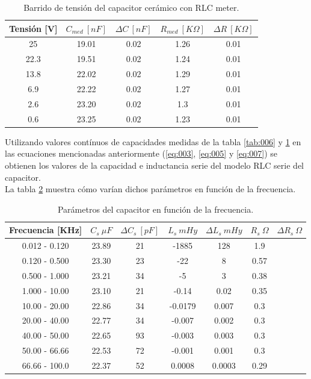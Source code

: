 \documentclass[a4paper,10pt]{article}
\begin{document}
		\begin{table}[!htp]
			\centering
			\begin{tabular}{|c|c|c|c|c|}
				\hline
				Tensión [V] & $C_{med}~[nF]$ & $\Delta C~[nF]$ & 
				$R_{med}~[K\Omega]$ & $\Delta R~[K\Omega]$\\
				\hline
				25 &	19.01 & 0.02 & 1.26 & 0.01 \\
				\hline
				22.3 &	19.51 & 0.02 & 1.24 & 0.01 \\
				\hline
				13.8 &	22.02 & 0.02 & 1.29 & 0.01 \\
				\hline
				6.9 &	22.22 & 0.02 & 1.27 & 0.01 \\
				\hline
				2.6 &	23.20 & 0.02 & 1.3 & 0.01 \\
				\hline
				0.6 &	23.25 & 0.02 & 1.23 & 0.01 \\
				\hline	  
			\end{tabular}
			\caption{Barrido de tensión del capacitor cerámico con RLC 
			meter.} 
			\label{tab:007}
		\end{table}	
		
		\indent Utilizando valores contínuos de capacidades medidas de la tabla
		\ref{tab:006} y \ref{tab:007} en las ecuaciones mencionadas anteriormente
		(\ref{eq:003}, \ref{eq:005} y \ref{eq:007}) se obtienen los valores de
		la capacidad e inductancia serie del modelo RLC serie del capacitor. \\
		\indent La tabla \ref{tab:008} muestra cómo varían dichos parámetros en 
		función de la frecuencia.
		
		\begin{table}[!htp]
			\centering
			\begin{tabular}{|c|c|c|c|c|c|c|}
				\hline
				Frecuencia [KHz] & $C_s~\mu F$ & $\Delta C_s~[pF]$ & 
				$L_s~mHy$  & $\Delta L_s~mHy$  & $R_s~\Omega$ & 
				$\Delta R_s~\Omega$ \\
				\hline
				0.012 - 0.120 &	23.89 & 21 & -1885 & 128 & 1.9 & \\
				\hline
				0.120 - 0.500 &	23.30 & 23 & -22 & 8 & 0.57 & \\
				\hline
				0.500 - 1.000 &	23.21 & 34 & -5 & 3 & 0.38 & \\
				\hline
				1.000 - 10.00 &	23.10 & 21 & -0.14 & 0.02 & 0.35 & \\
				\hline
				10.00 - 20.00 &	22.86 & 34 & -0.0179 & 0.007 & 0.3 & \\
				\hline
				20.00 - 40.00 &	22.77 & 34 & -0.007 & 0.002 & 0.3 & \\   
				\hline
				40.00 - 50.00 &	22.65 & 93 & -0.003 & 0.003 & 0.3 & \\
				\hline
				50.00 - 66.66 &	22.53 & 72 & -0.001 & 0.001 & 0.3 & \\
				\hline
				66.66 - 100.0 &	22.37 & 52 & 0.0008 & 0.0003 & 0.29 & \\
				\hline	  
			\end{tabular}
			\caption{Parámetros del capacitor en función de la frecuencia.} 
			\label{tab:008}
		\end{table}	
\end{document}
